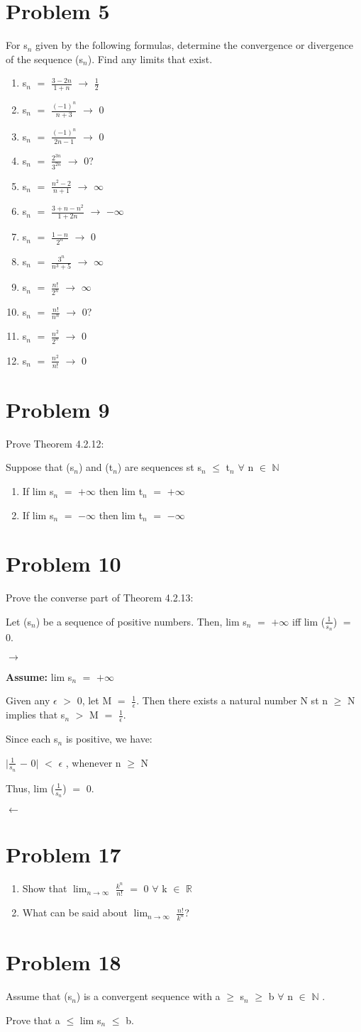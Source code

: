 \documentclass{article}
\newcommand{\mt}[1]{\ensuremath{#1}}
\newcommand\bsc[2][\DefaultOpt]{%
  \def\DefaultOpt{#2}%
  \section[#1]{#2}%
}
\newcommand{\balist}{\begin{enumerate}[label=\alph*.]}
\newcommand{\elist}{\end{enumerate}}
\newcommand{\as}[1]{\textbf{Assume: } #1}
\newcommand{\br}{\mt{\mathbb{R}} }       %
\newcommand{\bn}{\mt{\mathbb{N}} }       %
\newcommand{\ep}{\mt{\epsilon} }         %
\newcommand{\fa}{\mt{\forall} }          %
\newcommand{\mem}{\mt{\in} }
\newcommand{\lra}{ \mt{\longrightarrow} } %
\newcommand{\lla}{ \mt{\longleftarrow} }  %
\newcommand{\av}[1]{\mt{|}#1\mt{|}}  %
\newcommand{\prn}[1]{(#1)}
\newcommand{\ms}{\mt{-} }
\newcommand{\ls}{\mt{<} }
\newcommand{\gr}{\mt{>} }
\newcommand{\lse}{\mt{\leq} }
\newcommand{\gre}{\mt{\geq} }
\newcommand{\eql}{\mt{=} }
\newcommand{\uw}[2]{#1\mt{_{#2}}}
\newcommand{\frc}[2]{\mt{\frac{#1}{#2}}}
\newcommand{\lmti}[1]{\mt{\displaystyle{\lim_{#1 \to \infty}}}}
\begin{document}
\bsc{Problem 5}{
For \uw{s}{n} given by the following formulas, determine the convergence or divergence of the sequence \prn{\uw{s}{n}}. Find any limits that exist.

\balist
\item \uw{s}{n} \eql \frc{3 - 2n}{1 + n} \lra \frc{1}{2}
\item \uw{s}{n} \eql \frc{(-1)^n}{n + 3} \lra 0
\item \uw{s}{n} \eql \frc{(-1)^n}{2n - 1} \lra 0
\item \uw{s}{n} \eql \frc{2^{3n}}{3^{2n}} \lra 0?
\item \uw{s}{n} \eql \frc{n^2 - 2}{n + 1} \lra $\infty$
\item \uw{s}{n} \eql \frc{3 + n - n^2}{1 + 2n} \lra $-\infty$
\item \uw{s}{n} \eql \frc{1 - n}{2^n	} \lra 0
\item \uw{s}{n} \eql \frc{3^n}{n^3 + 5} \lra $\infty$
\item \uw{s}{n} \eql \frc{n!}{2^n} \lra $\infty$
\item \uw{s}{n} \eql \frc{n!}{n^n} \lra 0?
\item \uw{s}{n} \eql \frc{n^2}{2^n} \lra 0
\item \uw{s}{n} \eql \frc{n^2}{n!} \lra 0
\elist
}

\bsc{Problem 9}{
Prove Theorem 4.2.12:

Suppose that \prn{\uw{s}{n}} and \prn{\uw{t}{n}} are sequences st \uw{s}{n} \lse \uw{t}{n} \fa n \mem \bn

\balist
\item If lim \uw{s}{n} \eql $+\infty$ then lim \uw{t}{n} \eql $+\infty$ 
\item If lim \uw{s}{n} \eql $-\infty$ then lim \uw{t}{n} \eql $-\infty$ 
\elist
}

\bsc{Problem 10}{
Prove the converse part of Theorem 4.2.13:

Let \prn{\uw{s}{n}} be a sequence of positive numbers. Then, lim \uw{s}{n} \eql $+\infty$ iff lim (\frc{1}{\uw{s}{n}}) \eql 0.

\lra

\as{lim \uw{s}{n} \eql $+\infty$}

Given any \ep \gr 0, let M \eql \frc{1}{\ep}. Then there exists a natural number N st n \gre N implies that \uw{s}{n} \gr M \eql \frc{1}{\ep}.

Since each \uw{s}{n} is positive, we have:

\av{\frc{1}{\uw{s}{n}} \ms 0} \ls \ep, whenever n \gre N

Thus, lim (\frc{1}{\uw{s}{n}}) \eql 0.

\lla 

}

\bsc{Problem 17}{
\balist
\item Show that \lmti{n} \frc{k^n}{n!} \eql 0 \fa k \mem \br
\item What can be said about \lmti{n} \frc{n!}{k^n}?
\elist
}

\bsc{Problem 18}{
Assume that \prn{\uw{s}{n}} is a convergent sequence with a \gre \uw{s}{n} \gre b \fa n \mem \bn.

Prove that a \lse lim \uw{s}{n} \lse b.
}
\end{document}
